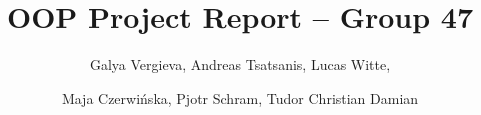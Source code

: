 \documentclass[sigconf]{acmart}
\title{OOP Project Report -- Group 47}
\author{Galya Vergieva, Andreas Tsatsanis, Lucas Witte,}
\author{Maja Czerwińska, Pjotr Schram, Tudor Christian Damian}
\begin{document}
\begin{abstract}

\end{abstract}

\maketitle












% 



\end{document}
